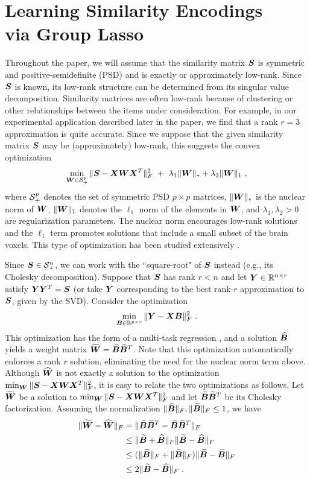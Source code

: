\section{Learning Similarity Encodings \\ via Group Lasso}


Throughout the paper, we will assume that the similarity matrix $\boldsymbol{S}$ is symmetric and positive-semidefinite (PSD) and is exactly or approximately low-rank.  Since $\boldsymbol{S}$ is known, its low-rank structure can be determined from its singular value decomposition. Similarity matrices are often low-rank because of clustering or other relationships between the items under consideration. For example, in our experimental application described later in the paper, we find that a rank $r=3$ approximation is quite accurate.  Since we suppose that the given similarity matrix $\boldsymbol{S}$ may be (approximately) low-rank, this suggests the convex optimization
$$\min_{\bW\in \S_+^p} \|\bS-\bX\bW\bX^T\|_F^2 \ + \ \lambda_1 \|\bW\|_\ast + \lambda_2 \|\bW\|_1 \ , $$
where $\S_+^p$ denotes the set of symmetric PSD $p\times p$ matrices, $ \|\boldsymbol{W}\|_\ast$ is the nuclear norm of $\boldsymbol{W}$, $\|\boldsymbol{W}\|_1 $ denotes the $\ell_1$ norm of the elements in $\boldsymbol{W}$, and $\lambda_1,\lambda_2>0$ are regularization parameters.  The nuclear norm encourages low-rank solutions and the $\ell_1$ term promotes solutions that include a small subset of the brain voxels. 
This type of optimization has been studied extensively \cite{maryam}.

Since $\bS \in \S_+^n$, we can work with the ``square-root" of $\boldsymbol{S}$ instead (e.g., its Cholesky decomposition).  Suppose that $\boldsymbol{S}$ has rank $r<n$ and let $\boldsymbol{Y}\in {\mathbb R}^{n\times r}$ satisfy $\boldsymbol{Y}\boldsymbol{Y}^T = \boldsymbol{S}$ (or take $\boldsymbol{Y}$ corresponding to the best rank-$r$ approximation to $\boldsymbol{S}$, given by the SVD). Consider the optimization
\begin{eqnarray}
\min_{\boldsymbol{B}\in {\mathbb R}^{p\times r}} \|\boldsymbol{Y}-\boldsymbol{X}\boldsymbol{B}\|_F^2 \ .
\end{eqnarray}
This  optimization has the form of a multi-task regression \cite{obo11,lounici,vandegeer}, and a solution $\widehat {\boldsymbol{B}}$ yields a weight matrix $\widehat {\boldsymbol{W}} =  \widehat {\boldsymbol{B}} \widehat{\boldsymbol{B}}^{T}$.  Note that this optimization automatically enforces a rank $r$ solution, eliminating the need for the nuclear norm term above.
Although $\widehat {\boldsymbol{W}}$ is not exactly a solution to the optimization $\min_{\boldsymbol{W}} \|\boldsymbol{S}-\boldsymbol{X}\boldsymbol{W}\boldsymbol{X}^T\|_F^2$, it is easy to relate the two optimizations as follows.  Let $\widetilde {\boldsymbol{W}}$ be a solution to $\min_{\boldsymbol{W}} \|\boldsymbol{S}-\boldsymbol{X}\boldsymbol{W}\boldsymbol{X}^T\|_F^2$ and let $\widetilde {\boldsymbol{B}}\widetilde{\boldsymbol{B}}^T$ be its Cholesky factorization.
Assuming the normalization  $\|\widehat{\boldsymbol{B}}\|_F, \|\widetilde {\boldsymbol{B}}\|_F \leq 1$, we have
\begin{align*}
\|\widetilde {\boldsymbol{W}} - \widehat{\boldsymbol{W}} \|_F &= \|\widetilde {\boldsymbol{B}} \widetilde{\boldsymbol{B}}^{T} - \widehat{\boldsymbol{B}} \widehat{\boldsymbol{B}}^T\|_F\\
&\leq \|\widetilde {\boldsymbol{B}} + \widehat{\boldsymbol{B}} \|_F \|\widetilde {\boldsymbol{B}} - \widehat{\boldsymbol{B}}\|_F\\
&\leq (\|\widetilde{\boldsymbol{B}}\|_F + \|\widehat{\boldsymbol{B}}\|_F) \|\widetilde{\boldsymbol{B}} - \widehat{\boldsymbol{B}}\|_F\\
&\leq 2\|\widetilde{\boldsymbol{B}} - \widehat{\boldsymbol{B}}\|_F \ .
\end{align*}

